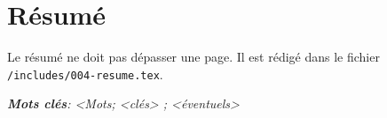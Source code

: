 \newpage

\section*{Résumé}
  
Le résumé ne doit pas dépasser une page. Il est rédigé dans le fichier \texttt{/includes/004-resume.tex}.

\bigskip

\textbf{\emph{Mots clés}}\emph{: <Mots; <clés> 
; <éventuels>}
